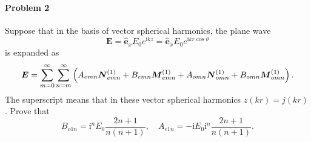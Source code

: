 \documentclass[hyperref, a4paper]{article}
\begin{document}
\paragraph{Problem 2} Suppose that in the basis of vector spherical harmonics, the plane wave 
\begin{equation}
    \boldsymbol{E}=\hat{\boldsymbol{e}}_{x} E_{0} e^{\mathrm{i} k z}=\hat{\boldsymbol{e}}_{x} E_{0} e^{\mathrm{i} k r \cos \theta}
\end{equation}
is expanded as 
\begin{equation}
    \vb*{E} = \sum_{m = 0}^\infty \sum_{n = m}^\infty \left( A_{emn} \vb*{N}_{emn}^{(1)} + B_{emn} \vb*{M}_{emn}^{(1)} + A_{omn} \vb*{N}_{omn}^{(1)} + B_{omn} \vb*{M}_{omn}^{(1)} \right).
\end{equation}
The superscript means that in these vector spherical harmonics $z(kr) = j(kr)$.
Prove that 
\begin{equation}
    B_{o 1 n}=\mathrm{i}^{n} E_{0} \frac{2 n+1}{n(n+1)}, \quad A_{e 1 n}=-\mathrm{i} E_{0} \mathrm{i}^{n} \frac{2 n+1}{n(n+1)}.
\end{equation}
\end{document}
